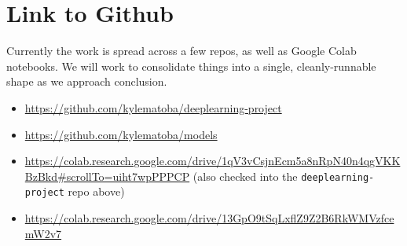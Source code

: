 \documentclass[10pt,twocolumn,letterpaper]{article}
\begin{document}
\section{Link to Github}
	Currently the work is spread across a few repos, as well as Google Colab notebooks. We will work to consolidate things into a single, cleanly-runnable shape as we approach conclusion.

	\begin{itemize}
	\item \url{https://github.com/kylematoba/deeplearning-project}
	\item \url{https://github.com/kylematoba/models}
	\item \url{https://colab.research.google.com/drive/1qV3vCsjnEcm5a8nRpN40n4qgVKKBzBkd#scrollTo=uiht7wpPPPCP} (also checked into the \texttt{deeplearning-project} repo above)
	\item \url{https://colab.research.google.com/drive/13GpO9tSqLxflZ9Z2B6RkWMVzfcemW2v7}
	\end{itemize}


\nocite{Torralba2008}
{\small


}
\end{document}
